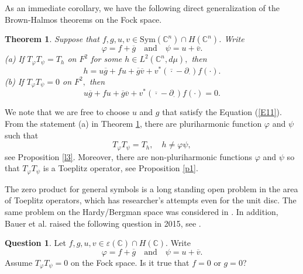 \documentclass[11pt,reqno]{amsart}
\newtheorem{theorem}{Theorem}
\theoremstyle{definition}
\newtheorem{ques}{Question}
\begin{document}
As an immediate corollary, we have the following direct generalization of the Brown-Halmos theorems on the Fock space.
\begin{theorem}\label{TT2}
Suppose that $f,g,u,v\in \text{Sym}(\mathbb{C}^n)\cap H(\mathbb{C}^n)$. Write
$$\varphi=f+\overline{g}\quad\text{and}\quad\psi=u+\overline{v}.$$
(a) If $T_{\varphi}T_{\psi}=T_h$ on $F^2$ for some $h\in L^{2}(\mathbb{C}^n,d\mu),$ then
\begin{equation}\label{E11}
h=u\overline{g}+fu+\overline{g}\overline{v}+v^*({\overline{\cdot}}-\partial_\cdot) f(\cdot).
\end{equation}
(b) If $T_{\varphi}T_{\psi}=0$ on $F^2,$  then
\begin{equation*}
u\overline{g}+fu+\overline{g}\overline{v}+v^*({\overline{\cdot}}-\partial_\cdot) f(\cdot)=0.
\end{equation*}
\end{theorem}
We note that we are free to choose $u$ and $g$ that satisfy the  Equation  (\ref{E11}).
From the statement (a) in Theorem \ref{TT2}, there are pluriharmonic function $\varphi$ and $\psi$  such that $$T_{\varphi}T_{\psi}=T_h,\quad h\neq\varphi\psi,$$ see Proposition \ref{l3}. Moreover, there are  non-pluriharmonic functions $\varphi$ and $\psi$ so that $T_{\varphi}T_{\psi}$ is a Toeplitz operator, see Proposition \ref{p1}.



The zero product for  general symbols is a long standing open problem in the area of Toeplitz operators, which has researcher's attempts even for the unit disc. The same problem on the Hardy/Bergman space was considered in \cite{Aleman,Brown,Choe1,Le}.
 In addition, Bauer et al.  \cite{Bauer1} raised the following question in 2015, see \cite[Theorem 4.2, p3047]{Bauer}.
\begin{ques}\label{Q2}
Let $f,g,u,v\in \varepsilon(\mathbb{C})\cap H(\mathbb{C})$. Write
$$\varphi=f+\overline{g}\quad\text{and}\quad\psi=u+\overline{v}.$$ Assume $ T_\varphi T_\psi=0$ on the Fock space. Is it true that $f = 0$ or $g = 0$?
\end{ques}
\end{document}
